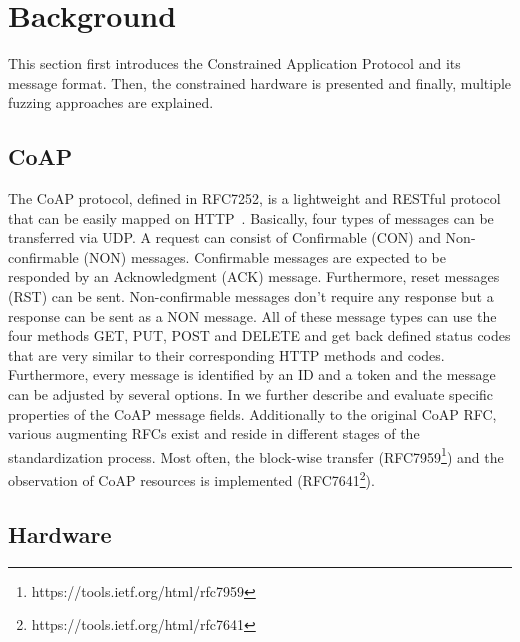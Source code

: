 \section{Background}
\label{section:background}

This section first introduces the Constrained Application Protocol and its message format. Then, the constrained hardware is presented and finally, multiple fuzzing approaches are explained.

\subsection{CoAP}

The CoAP protocol, defined in RFC7252, is a lightweight and RESTful protocol that can be easily mapped on HTTP~\cite{RFC7252}. Basically, four types of messages can be transferred via UDP. A request can consist of Confirmable (CON) and Non-confirmable (NON) messages. Confirmable messages are expected to be responded by an Acknowledgment (ACK) message. Furthermore, reset messages (RST) can be sent. Non-confirmable messages don't require any response but a response can be sent as a NON message. All of these message types can use the four methods GET, PUT, POST and DELETE and get back defined status codes that are very similar to their corresponding HTTP methods and codes. Furthermore, every message is identified by an ID and a token and the message can be adjusted by several options. In  we further describe and evaluate specific properties of the CoAP message fields.
Additionally to the original CoAP RFC, various augmenting RFCs exist and reside in different stages of the standardization process. Most often, the block-wise transfer (RFC7959\footnote{https://tools.ietf.org/html/rfc7959}) and the observation of CoAP resources is implemented (RFC7641\footnote{https://tools.ietf.org/html/rfc7641}).

\subsection{Hardware}

